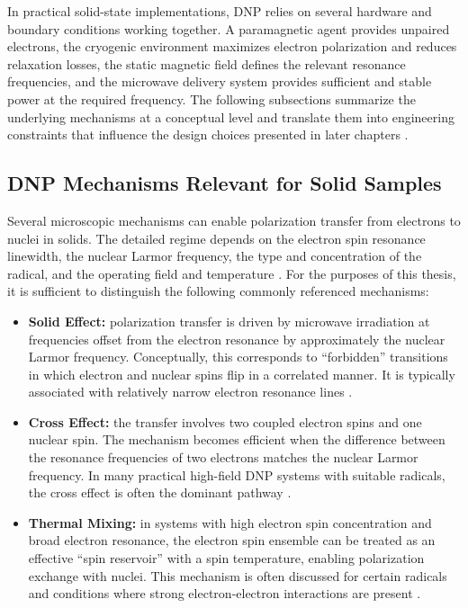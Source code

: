 \documentclass[FM,DP,EN,twoside]{tulthesis}
\begin{document}
In practical solid-state implementations, DNP relies on several hardware and boundary conditions working together. A paramagnetic agent provides unpaired electrons, the cryogenic environment maximizes electron polarization and reduces relaxation losses, the static magnetic field defines the relevant resonance frequencies, and the microwave delivery system provides sufficient and stable power at the required frequency. The following subsections summarize the underlying mechanisms at a conceptual level and translate them into engineering constraints that influence the design choices presented in later chapters \cite{abragam_goldman_1978}.

\subsection{DNP Mechanisms Relevant for Solid Samples}
\label{subsec:dnp-mechanisms-solid}
Several microscopic mechanisms can enable polarization transfer from electrons to nuclei in solids. The detailed regime depends on the electron spin resonance linewidth, the nuclear Larmor frequency, the type and concentration of the radical, and the operating field and temperature \cite{DNP_mechanisms_review}. For the purposes of this thesis, it is sufficient to distinguish the following commonly referenced mechanisms:

\begin{itemize}
  \item \textbf{Solid Effect:} polarization transfer is driven by microwave irradiation at frequencies offset from the electron resonance by approximately the nuclear Larmor frequency. Conceptually, this corresponds to ``forbidden'' transitions in which electron and nuclear spins flip in a correlated manner. It is typically associated with relatively narrow electron resonance lines \cite{solid_effect_ref}.
  \item \textbf{Cross Effect:} the transfer involves two coupled electron spins and one nuclear spin. The mechanism becomes efficient when the difference between the resonance frequencies of two electrons matches the nuclear Larmor frequency. In many practical high-field DNP systems with suitable radicals, the cross effect is often the dominant pathway \cite{cross_effect_ref}.
  \item \textbf{Thermal Mixing:} in systems with high electron spin concentration and broad electron resonance, the electron spin ensemble can be treated as an effective ``spin reservoir'' with a spin temperature, enabling polarization exchange with nuclei. This mechanism is often discussed for certain radicals and conditions where strong electron-electron interactions are present \cite{thermal_mixing_ref}.
\end{itemize}
\end{document}

